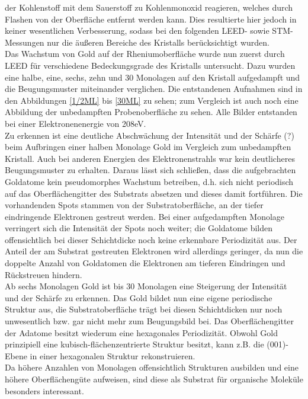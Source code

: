 der Kohlenstoff mit dem Sauerstoff zu
Kohlenmonoxid reagieren, welches durch Flashen von der Oberfläche entfernt werden kann. Dies
resultierte hier jedoch in keiner wesentlichen Verbesserung, sodass bei den folgenden LEED- sowie
STM-Messungen nur die äußeren Bereiche des Kristalls berücksichtigt wurden.\\
Das Wachstum von Gold auf der Rheniumoberfläche wurde nun zuerst durch LEED für
verschiedene Bedeckungsgrade des Kristalls untersucht. Dazu wurden eine halbe, eine, sechs, zehn und
30 Monolagen auf den Kristall aufgedampft und die Beugungsmuster miteinander verglichen. Die
entstandenen Aufnahmen sind in den Abbildungen \ref{1/2ML} bis \ref{30ML} zu sehen; zum Vergleich
ist auch noch eine Abbildung der unbedampften Probenoberfläche zu sehen. Alle Bilder entstanden
bei einer Elektronenenergie von 208eV.\\
Zu erkennen ist eine deutliche Abschwächung der Intensität und der Schärfe (?) beim Aufbringen einer
halben Monolage Gold im Vergleich zum unbedampften Kristall. Auch bei anderen Energien des
Elektronenstrahls war kein deutlicheres Beugungsmuster zu erhalten. Daraus lässt sich schließen,
dass die aufgebrachten Goldatome kein pseudomorphes Wachstum betreiben, d.h. sich nicht periodisch
auf das Oberflächengitter des Substrats absetzen und dieses damit fortführen. Die vorhandenden Spots
stammen von der Substratoberfläche, an der tiefer eindringende Elektronen gestreut werden. Bei einer
aufgedampften Monolage verringert sich die Intensität der Spots noch weiter; die Goldatome bilden
offensichtlich bei dieser Schichtdicke noch keine erkennbare Periodizität aus. Der Anteil der am
Substrat gestreuten Elektronen wird allerdings geringer, da nun die doppelte Anzahl von Goldatomen
die Elektronen am tieferen Eindringen und Rückstreuen hindern.\\
Ab sechs Monolagen Gold ist bis 30 Monolagen eine Steigerung der Intensität und der Schärfe zu
erkennen. Das Gold bildet nun eine eigene periodische Struktur aus, die Substratoberfläche trägt
bei diesen Schichtdicken nur noch unwesentlich bzw. gar nicht mehr zum Beugungsbild bei. Das
Oberflächengitter der Adatome besitzt wiederum eine hexagonales Periodizität. Obwohl Gold
prinzipiell eine kubisch-flächenzentrierte Struktur besitzt, kann z.B. die (001)-Ebene in einer
hexagonalen Struktur rekonstruieren.\\
Da höhere Anzahlen von Monolagen offensichtlich Strukturen ausbilden und eine höhere Oberflächengüte
aufweisen, sind diese als Substrat für organische Moleküle besonders interessant. 
